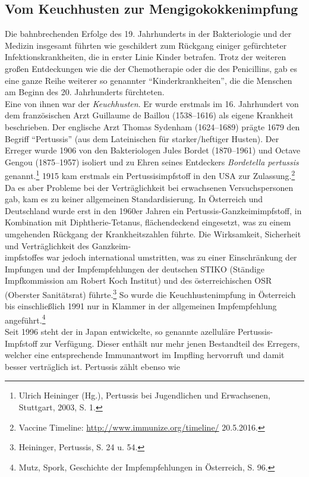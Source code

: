 \documentclass[
    a4paper,
    12pt,
    hyphens,
    chapterprefix=true,
    headheight=33pt,
    footheight=29pt,
    headings=optiontohead, %
]{scrartcl}
\begin{document}
\subsection{Vom Keuchhusten zur Mengigokokkenimpfung}
Die bahnbrechenden Erfolge des 19. Jahrhunderts in der Bakteriologie und der Medizin insgesamt führten wie geschildert zum Rückgang einiger gefürchteter Infektionskrankheiten, die in erster Linie Kinder betrafen. Trotz der weiteren großen Entdeckungen wie die der Chemotherapie oder die des Penicillins, gab es eine ganze Reihe weiterer so genannter "`Kinderkrankheiten"', die die Menschen am Beginn des 20. Jahrhunderts fürchteten.\\
Eine von ihnen war der \textit{Keuchhusten}. Er wurde erstmals im 16. Jahrhundert von dem französischen Arzt Guillaume de Baillou (1538--1616) als eigene Krankheit beschrieben. Der englische Arzt Thomas Sydenham (1624--1689) prägte 1679 den Begriff "`Pertussis"' (aus dem Lateinischen für starker/heftiger Husten). Der Erreger wurde 1906 von den Bakteriologen Jules Bordet (1870--1961) und Octave Gengou (1875--1957) isoliert und zu Ehren seines Entdeckers \textit{Bordetella pertussis} genannt.\footnote{Ulrich Heininger (Hg.), Pertussis bei Jugendlichen und Erwachsenen, Stuttgart, 2003, S. 1.} 1915 kam erstmals ein Pertussisimpfstoff in den USA zur Zulassung.\footnote{Vaccine Timeline: \url{http://www.immunize.org/timeline/} 20.5.2016.} Da es aber Probleme bei der Verträglichkeit bei erwachsenen Versuchspersonen gab, kam es zu keiner allgemeinen Standardisierung. In Österreich und Deutschland wurde erst in den 1960er Jahren ein Pertussis-Ganzkeimimpfstoff, in Kombination mit Diphtherie-Tetanus, flächendeckend eingesetzt, was zu einem umgehenden Rückgang der Krankheitszahlen führte. Die Wirksamkeit, Sicherheit und Verträglichkeit des Ganzkeim-\\impfstoffes war jedoch international umstritten, was zu einer Einschränkung der Impfungen und der Impfempfehlungen der deutschen STIKO (Ständige Impfkommission am Robert Koch Institut) und des österreichischen OSR (Oberster Sanitätsrat) führte.\footnote{Heininger, Pertussis, S. 24 u. 54.} So wurde die Keuchhustenimpfung in Österreich bis einschließlich 1991 nur in Klammer in der allgemeinen Impfempfehlung angeführt.\footnote{Mutz, Spork, Geschichte der Impfempfehlungen in Österreich, S. 96.} \\
Seit 1996 steht der in Japan entwickelte, so genannte azelluläre Pertussis-Impfstoff zur Verfügung. Dieser enthält nur mehr jenen Bestandteil 
des Erregers, welcher eine entsprechende Immunantwort im Impfling hervorruft und damit besser verträglich ist. Pertussis zählt ebenso wie 
\end{document}
